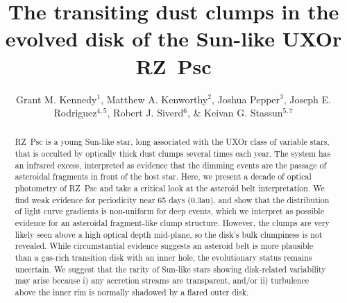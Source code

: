 \documentclass[]{rsos}
\begin{document}
\title[The transiting dust clumps of RZ~Psc]{The transiting dust clumps in the evolved
  disk of the Sun-like UXOr RZ~Psc}

\author[Grant M. Kennedy et al]{Grant M. Kennedy$^1$,
  Matthew A. Kenworthy$^2$,
  Joshua Pepper$^3$,
  Joseph E. Rodriguez$^{4,5}$, 
  Robert J. Siverd$^6$, \&
  Keivan G. Stassun$^{5,7}$}

\address{\footnotesize{$^1$ Institute of Astronomy, University of Cambridge, Madingley Road, Cambridge CB3
  0HA, UK \\
  $^2$ Leiden Observatory, Leiden University, PO Box 9513, NL-2300 RA Leiden, the
  Netherlands \\
  $^3$ Department of Physics, Lehigh University, 16 Memorial Drive East, Bethlehem, PA
  18015, USA \\
  $^4$ Harvard-Smithsonian Center for Astrophysics, 60 Garden Street, MS-78, Cambridge, MA
  02138, USA \\
  $^5$ Department of Physics and Astronomy, Vanderbilt University, 6301 Stevenson Center,
  Nashville, TN 37235, USA \\
  $^6$ Las Cumbres Observatory Global Telescope Network, 6740 Cortona Dr., Suite 102, Santa
  Barbara, CA 93117, USA \\
  $^7$ Department of Physics, Fisk University, 1000 17th Avenue North, Nashville, TN
  37208, USA \\
}}

\subject{astrophysics, extrasolar planets, stars}



\begin{fmtext}
\end{fmtext}

\begin{abstract}
  RZ~Psc is a young Sun-like star, long associated with the UXOr class of variable stars,
  that is occulted by optically thick dust clumps several times each year. The system has
  an infrared excess, interpreted as evidence that the dimming events are the passage of
  asteroidal fragments in front of the host star. Here, we present a decade of optical
  photometry of RZ~Psc and take a critical look at the asteroid belt interpretation. We
  find weak evidence for periodicity near 65 days (0.3au), and show that the distribution
  of light curve gradients is non-uniform for deep events, which we interpret as possible
  evidence for an asteroidal fragment-like clump structure. However, the clumps are very
  likely seen above a high optical depth mid-plane, so the disk's bulk clumpiness is not
  revealed. While circumstantial evidence suggests an asteroid belt is more plausible
  than a gas-rich transition disk with an inner hole, the evolutionary status remains
  uncertain. We suggest that the rarity of Sun-like stars showing disk-related
  variability may arise because i) any accretion streams are transparent, and/or ii)
  turbulence above the inner rim is normally shadowed by a flared outer disk.
\end{abstract}
\end{document}
